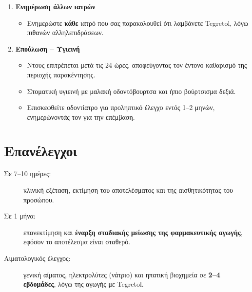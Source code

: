 \documentclass[10pt,greek]{article}
\begin{document}
\begin{enumerate}[label=\arabic*.]
  \item \textbf{Ενημέρωση άλλων ιατρών}
      \begin{itemize}
\item Ενημερώστε \textbf{κάθε} ιατρό που σας παρακολουθεί ότι λαμβάνετε Tegretol, λόγω πιθανών αλληλεπιδράσεων.
    \end{itemize}
  \item \textbf{Επούλωση -- Υγιεινή}
        \begin{itemize}
\item Ντους επιτρέπεται μετά τις 24 ώρες, αποφεύγοντας τον έντονο καθαρισμό της περιοχής παρακέντησης.
\item Στοματική υγιεινή με μαλακή οδοντόβουρτσα και ήπιο βούρτσισμα δεξιά.
\item Επισκεφθείτε οδοντίατρο για προληπτικό έλεγχο εντός 1--2 μηνών, ενημερώνοντάς τον για την επέμβαση.
        \end{itemize}
\end{enumerate}

\section*{Επανέλεγχοι}
\begin{description}
\item[Σε 7--10 ημέρες:] κλινική εξέταση, εκτίμηση του αποτελέσματος και της αισθητικότητας του προσώπου.
\item[Σε 1 μήνα:] επανεκτίμηση και \textbf{έναρξη σταδιακής μείωσης της φαρμακευτικής αγωγής}, εφόσον το αποτέλεσμα είναι σταθερό.
\item[Αιματολογικός έλεγχος:] γενική αίματος, ηλεκτρολύτες (νάτριο) και ηπατική βιοχημεία σε \textbf{2--4 εβδομάδες}, λόγω της αγωγής με Tegretol.
\end{description}
\end{document}

